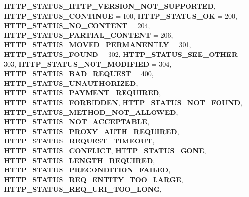 \begin{DoxyCompactItemize}
{\bfseries H\+T\+T\+P\+\_\+\+S\+T\+A\+T\+U\+S\+\_\+\+H\+T\+T\+P\+\_\+\+V\+E\+R\+S\+I\+O\+N\+\_\+\+N\+O\+T\+\_\+\+S\+U\+P\+P\+O\+R\+T\+ED}, 
{\bfseries H\+T\+T\+P\+\_\+\+S\+T\+A\+T\+U\+S\+\_\+\+C\+O\+N\+T\+I\+N\+UE} = 100, 
{\bfseries H\+T\+T\+P\+\_\+\+S\+T\+A\+T\+U\+S\+\_\+\+OK} = 200, 
\newline
{\bfseries H\+T\+T\+P\+\_\+\+S\+T\+A\+T\+U\+S\+\_\+\+N\+O\+\_\+\+C\+O\+N\+T\+E\+NT} = 204, 
{\bfseries H\+T\+T\+P\+\_\+\+S\+T\+A\+T\+U\+S\+\_\+\+P\+A\+R\+T\+I\+A\+L\+\_\+\+C\+O\+N\+T\+E\+NT} = 206, 
{\bfseries H\+T\+T\+P\+\_\+\+S\+T\+A\+T\+U\+S\+\_\+\+M\+O\+V\+E\+D\+\_\+\+P\+E\+R\+M\+A\+N\+E\+N\+T\+LY} = 301, 
{\bfseries H\+T\+T\+P\+\_\+\+S\+T\+A\+T\+U\+S\+\_\+\+F\+O\+U\+ND} = 302, 
\newline
{\bfseries H\+T\+T\+P\+\_\+\+S\+T\+A\+T\+U\+S\+\_\+\+S\+E\+E\+\_\+\+O\+T\+H\+ER} = 303, 
{\bfseries H\+T\+T\+P\+\_\+\+S\+T\+A\+T\+U\+S\+\_\+\+N\+O\+T\+\_\+\+M\+O\+D\+I\+F\+I\+ED} = 304, 
{\bfseries H\+T\+T\+P\+\_\+\+S\+T\+A\+T\+U\+S\+\_\+\+B\+A\+D\+\_\+\+R\+E\+Q\+U\+E\+ST} = 400, 
{\bfseries H\+T\+T\+P\+\_\+\+S\+T\+A\+T\+U\+S\+\_\+\+U\+N\+A\+U\+T\+H\+O\+R\+I\+Z\+ED}, 
\newline
{\bfseries H\+T\+T\+P\+\_\+\+S\+T\+A\+T\+U\+S\+\_\+\+P\+A\+Y\+M\+E\+N\+T\+\_\+\+R\+E\+Q\+U\+I\+R\+ED}, 
{\bfseries H\+T\+T\+P\+\_\+\+S\+T\+A\+T\+U\+S\+\_\+\+F\+O\+R\+B\+I\+D\+D\+EN}, 
{\bfseries H\+T\+T\+P\+\_\+\+S\+T\+A\+T\+U\+S\+\_\+\+N\+O\+T\+\_\+\+F\+O\+U\+ND}, 
{\bfseries H\+T\+T\+P\+\_\+\+S\+T\+A\+T\+U\+S\+\_\+\+M\+E\+T\+H\+O\+D\+\_\+\+N\+O\+T\+\_\+\+A\+L\+L\+O\+W\+ED}, 
\newline
{\bfseries H\+T\+T\+P\+\_\+\+S\+T\+A\+T\+U\+S\+\_\+\+N\+O\+T\+\_\+\+A\+C\+C\+E\+P\+T\+A\+B\+LE}, 
{\bfseries H\+T\+T\+P\+\_\+\+S\+T\+A\+T\+U\+S\+\_\+\+P\+R\+O\+X\+Y\+\_\+\+A\+U\+T\+H\+\_\+\+R\+E\+Q\+U\+I\+R\+ED}, 
{\bfseries H\+T\+T\+P\+\_\+\+S\+T\+A\+T\+U\+S\+\_\+\+R\+E\+Q\+U\+E\+S\+T\+\_\+\+T\+I\+M\+E\+O\+UT}, 
{\bfseries H\+T\+T\+P\+\_\+\+S\+T\+A\+T\+U\+S\+\_\+\+C\+O\+N\+F\+L\+I\+CT}, 
\newline
{\bfseries H\+T\+T\+P\+\_\+\+S\+T\+A\+T\+U\+S\+\_\+\+G\+O\+NE}, 
{\bfseries H\+T\+T\+P\+\_\+\+S\+T\+A\+T\+U\+S\+\_\+\+L\+E\+N\+G\+T\+H\+\_\+\+R\+E\+Q\+U\+I\+R\+ED}, 
{\bfseries H\+T\+T\+P\+\_\+\+S\+T\+A\+T\+U\+S\+\_\+\+P\+R\+E\+C\+O\+N\+D\+I\+T\+I\+O\+N\+\_\+\+F\+A\+I\+L\+ED}, 
{\bfseries H\+T\+T\+P\+\_\+\+S\+T\+A\+T\+U\+S\+\_\+\+R\+E\+Q\+\_\+\+E\+N\+T\+I\+T\+Y\+\_\+\+T\+O\+O\+\_\+\+L\+A\+R\+GE}, 
\newline
{\bfseries H\+T\+T\+P\+\_\+\+S\+T\+A\+T\+U\+S\+\_\+\+R\+E\+Q\+\_\+\+U\+R\+I\+\_\+\+T\+O\+O\+\_\+\+L\+O\+NG}, 

\end{DoxyCompactItemize}
